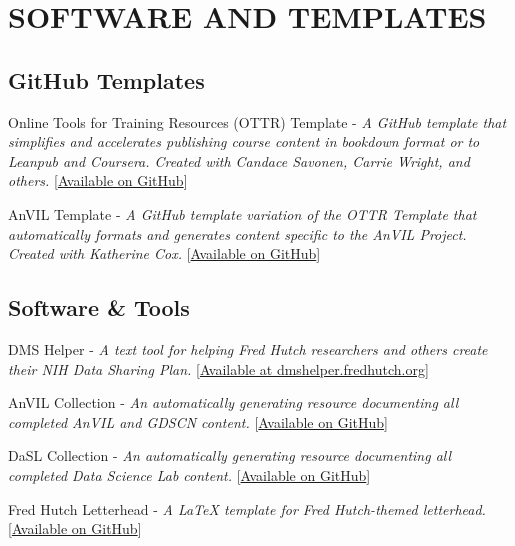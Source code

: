 \documentclass{cv}
\begin{document}
\section*{SOFTWARE AND TEMPLATES}

\subsection*{GitHub Templates}

Online Tools for Training Resources (OTTR) Template - \textit{A GitHub template that simplifies and accelerates publishing course content in bookdown format or to Leanpub and Coursera. Created with Candace Savonen, Carrie Wright, and others.} [\href{https://github.com/jhudsl/OTTR_Template}{Available on GitHub}]

AnVIL Template - \textit{A GitHub template variation of the OTTR Template that automatically formats and generates content specific to the AnVIL Project. Created with Katherine Cox.} [\href{https://github.com/jhudsl/AnVIL_Template}{Available on GitHub}]

\subsection*{Software \& Tools}

DMS Helper - \textit{A text tool for helping Fred Hutch researchers and others create their NIH Data Sharing Plan.} [\href{https://dmshelper.fredhutch.org}{Available at dmshelper.fredhutch.org}]

AnVIL Collection - \textit{An automatically generating resource documenting all completed AnVIL and GDSCN content.} [\href{https://github.com/fhdsl/AnVIL_Collection}{Available on GitHub}]

DaSL Collection - \textit{An automatically generating resource documenting all completed Data Science Lab content.} [\href{https://github.com/fhdsl/DaSL_Collection}{Available on GitHub}]

Fred Hutch Letterhead - \textit{A LaTeX template for Fred Hutch-themed letterhead.} [\href{https://github.com/fhdsl/FH_letterhead}{Available on GitHub}]



\newpage
{}
\parttwo

\end{document}
